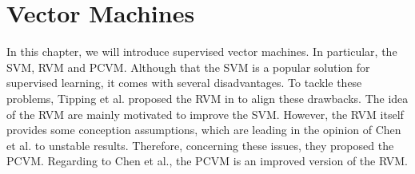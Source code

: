 \chapter{Vector Machines}\label{Pc}
In this chapter, we will introduce supervised vector machines.
In particular, the \ac{SVM}, \ac{RVM} and \ac{PCVM}.
Although that the \acs{SVM} is a popular solution for supervised learning, it comes with several disadvantages.\cite{Chen.2009}
To tackle these problems, Tipping et al. proposed the \acs{RVM} in \cite{Tipping.2001} to align these drawbacks.
The idea of the \acs{RVM} are mainly motivated to improve the \acs{SVM}\cite[p. 1-2]{Tipping.2001}.
However, the \acs{RVM} itself provides some conception assumptions, which are leading in the opinion of Chen et al. to unstable results.
Therefore, concerning these issues, they proposed the \acs{PCVM}.
Regarding to Chen et al., the \acs{PCVM} is an improved version of the \acs{RVM}.\cite{Chen.2009}
